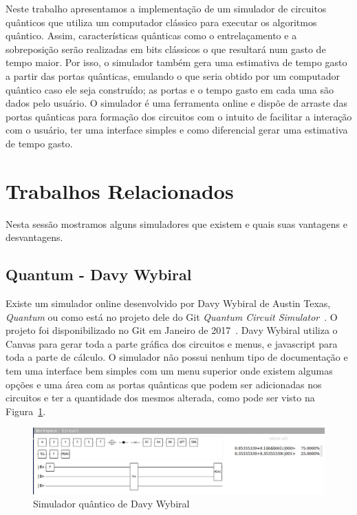 \documentclass[a4paper, 12pt, oneside]{book}
\begin{document}
Neste trabalho apresentamos a implementação de um simulador de circuitos quânticos que utiliza um computador clássico para executar os algoritmos quântico. Assim, características quânticas como o entrelaçamento e a sobreposição serão realizadas em bits clássicos o que resultará num gasto de tempo maior. Por isso, o simulador também gera uma estimativa de tempo gasto a partir das portas quânticas, emulando o que seria obtido por um computador quântico caso ele seja construído; as portas e o tempo gasto em cada uma são dados pelo usuário. O simulador é uma ferramenta online e dispõe de arraste das portas quânticas para formação dos circuitos com o intuito de facilitar a interação com o usuário, ter uma interface simples e como diferencial gerar uma estimativa de tempo gasto.

\section{Trabalhos Relacionados}

Nesta sessão mostramos alguns simuladores que existem e quais suas vantagens e desvantagens.

\subsection{Quantum - Davy Wybiral}

Existe um simulador online desenvolvido por Davy Wybiral de Austin Texas, \textit{Quantum} ou como está no projeto dele do Git \textit{Quantum Circuit Simulator}~\cite{davyw}. O projeto foi disponibilizado no Git em Janeiro de 2017~\cite{gitdavyw}. Davy Wybiral utiliza o Canvas para gerar toda a parte gráfica dos circuitos e menus, e javascript para toda a parte de cálculo. O simulador não possui nenhum tipo de documentação e tem uma interface bem simples com um menu superior onde existem algumas opções e uma área com as portas quânticas que podem ser adicionadas nos circuitos e ter a quantidade dos mesmos alterada, como pode ser visto na Figura~\ref{fig:davyw}.

\begin{figure}[H]
\centering
\includegraphics[scale=0.36]{davyw.jpg}
\caption{Simulador quântico de Davy Wybiral}
\label{fig:davyw}
\end{figure}
\end{document}

